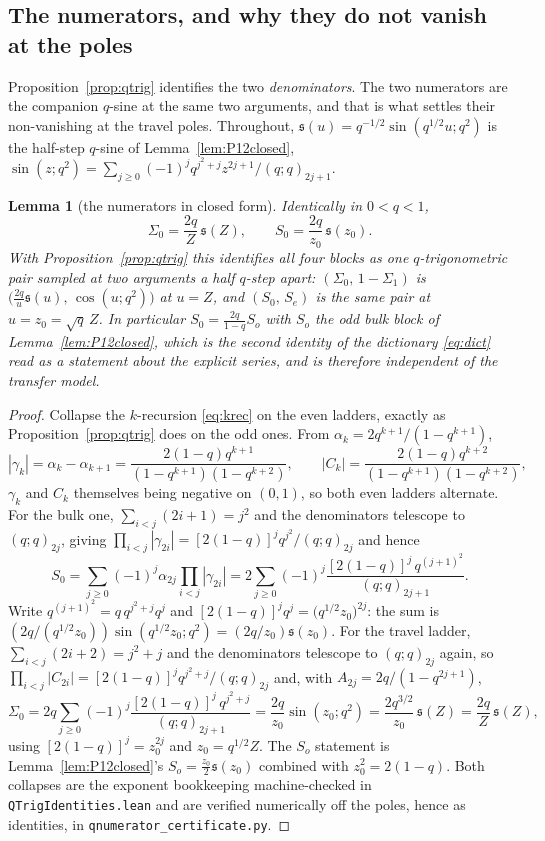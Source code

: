 \documentclass[11pt]{article}
\theoremstyle{plain}
\newtheorem{lemma}[theorem]{Lemma}
\theoremstyle{definition}
\theoremstyle{remark}
\begin{document}
\subsection{The numerators, and why they do not vanish at the poles}\label{sec:numerators}

Proposition~\ref{prop:qtrig} identifies the two \emph{denominators}. The two numerators are the
companion $q$-sine at the same two arguments, and that is what settles their non-vanishing at the
travel poles. Throughout, $\mathfrak s(u)=q^{-1/2}\sin(q^{1/2}u;q^2)$ is the half-step $q$-sine of
Lemma~\ref{lem:P12closed}, $\sin(z;q^2)=\sum_{j\ge0}(-1)^jq^{j^2+j}z^{2j+1}/(q;q)_{2j+1}$.

\begin{lemma}[the numerators in closed form]\label{lem:qsinenum}
Identically in $0<q<1$,
\[
   \Sigma_0=\frac{2q}{Z}\,\mathfrak s(Z),\qquad S_0=\frac{2q}{z_0}\,\mathfrak s(z_0).
\]
With Proposition~\ref{prop:qtrig} this identifies all four blocks as one $q$-trigonometric pair
sampled at two arguments a half $q$-step apart: $(\Sigma_0,\,1-\Sigma_1)$ is
$\bigl(\tfrac{2q}u\mathfrak s(u),\,\cos(u;q^2)\bigr)$ at $u=Z$, and $(S_0,\,S_e)$ is the same pair
at $u=z_0=\sqrt q\,Z$. In particular $S_0=\tfrac{2q}{1-q}S_o$ with $S_o$ the odd bulk block of
Lemma~\ref{lem:P12closed}, which is the second identity of the dictionary \eqref{eq:dict} read as a
statement about the explicit series, and is therefore independent of the transfer model.
\end{lemma}

\begin{proof}
Collapse the $k$-recursion \eqref{eq:krec} on the even ladders, exactly as
Proposition~\ref{prop:qtrig} does on the odd ones. From $\alpha_k=2q^{k+1}/(1-q^{k+1})$,
\[
  |\gamma_k|=\alpha_k-\alpha_{k+1}=\frac{2(1-q)q^{k+1}}{(1-q^{k+1})(1-q^{k+2})},\qquad
  |C_k|=\frac{2(1-q)q^{k+2}}{(1-q^{k+1})(1-q^{k+2})} ,
\]
$\gamma_k$ and $C_k$ themselves being negative on $(0,1)$, so both even ladders alternate. For the bulk one,
$\sum_{i<j}(2i+1)=j^2$ and the denominators telescope to $(q;q)_{2j}$, giving
$\prod_{i<j}|\gamma_{2i}|=[2(1-q)]^jq^{j^2}/(q;q)_{2j}$ and hence
\[
  S_0=\sum_{j\ge0}(-1)^j\alpha_{2j}\prod_{i<j}|\gamma_{2i}|
     =2\sum_{j\ge0}(-1)^j\frac{[2(1-q)]^j\,q^{(j+1)^2}}{(q;q)_{2j+1}} .
\]
Write $q^{(j+1)^2}=q\,q^{j^2+j}q^{j}$ and $[2(1-q)]^jq^{j}=\bigl(q^{1/2}z_0\bigr)^{2j}$: the sum is
$(2q/(q^{1/2}z_0))\sin(q^{1/2}z_0;q^2)=(2q/z_0)\mathfrak s(z_0)$. For the travel ladder,
$\sum_{i<j}(2i+2)=j^2+j$ and the denominators telescope to $(q;q)_{2j}$ again, so
$\prod_{i<j}|C_{2i}|=[2(1-q)]^jq^{j^2+j}/(q;q)_{2j}$ and, with $A_{2j}=2q/(1-q^{2j+1})$,
\[
  \Sigma_0=2q\sum_{j\ge0}(-1)^j\frac{[2(1-q)]^j\,q^{j^2+j}}{(q;q)_{2j+1}}
          =\frac{2q}{z_0}\sin(z_0;q^2)=\frac{2q^{3/2}}{z_0}\,\mathfrak s(Z)=\frac{2q}{Z}\,\mathfrak s(Z),
\]
using $[2(1-q)]^j=z_0^{2j}$ and $z_0=q^{1/2}Z$. The $S_o$ statement is Lemma~\ref{lem:P12closed}'s
$S_o=\tfrac{z_0}2\mathfrak s(z_0)$ combined with $z_0^2=2(1-q)$. Both collapses are the exponent
bookkeeping machine-checked in \texttt{QTrigIdentities.lean} and are verified numerically off the
poles, hence as identities, in \texttt{qnumerator\_certificate.py}.
\end{proof}
\end{document}
